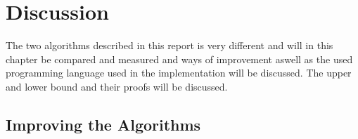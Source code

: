 \chapter{Discussion}
\emptyTop{}
The two algorithms described in this report is very different and will in this chapter be compared and measured and ways of improvement aswell as the used programming language used in the implementation will be discussed. 
The upper and lower bound and their proofs will be discussed. 




\section{Improving the Algorithms}



